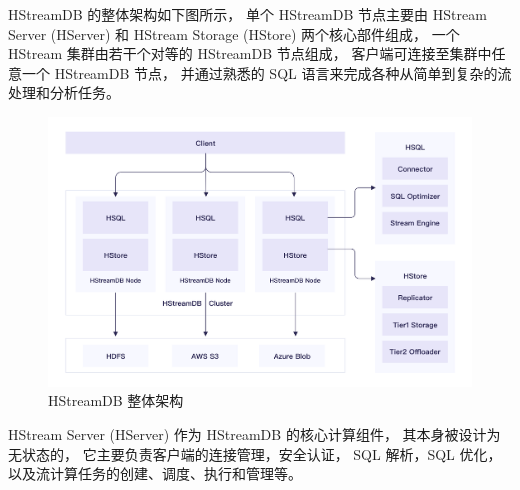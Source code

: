\documentclass{ctexart}
\begin{document}

HStreamDB 的整体架构如下图所示，
单个 HStreamDB 节点主要由 HStream Server (HServer) 和 HStream Storage (HStore) 两个核心部件组成，
一个 HStream 集群由若干个对等的 HStreamDB 节点组成，
客户端可连接至集群中任意一个 HStreamDB 节点，
并通过熟悉的 SQL 语言来完成各种从简单到复杂的流处理和分析任务。

\begin{figure}
  \centering
  \includegraphics[width=\textwidth]{pic/hstream-arch.png}
  \caption{HStreamDB 整体架构}
  \label{fig:hstream-arch}
\end{figure}

HStream Server (HServer) 作为 HStreamDB 的核心计算组件，
其本身被设计为无状态的，
它主要负责客户端的连接管理，安全认证，
SQL 解析，SQL 优化，
以及流计算任务的创建、调度、执行和管理等。
\end{document}
